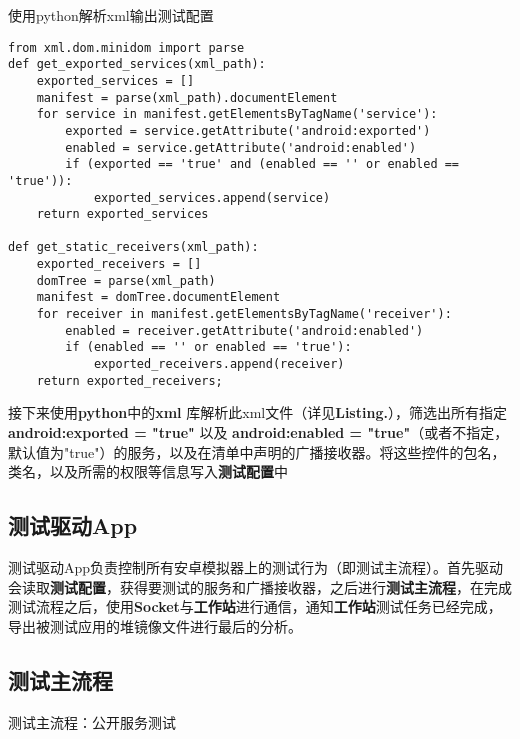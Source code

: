 \begin{listing}[htbp]
	\centering
	\caption{使用python解析xml输出测试配置}
	\begin{verbatim}
from xml.dom.minidom import parse
def get_exported_services(xml_path):
	exported_services = []
	manifest = parse(xml_path).documentElement 
	for service in manifest.getElementsByTagName('service'):
		exported = service.getAttribute('android:exported')
		enabled = service.getAttribute('android:enabled')
		if (exported == 'true' and (enabled == '' or enabled == 'true')):
			exported_services.append(service)
	return exported_services
	
def get_static_receivers(xml_path):
	exported_receivers = []
	domTree = parse(xml_path)
	manifest = domTree.documentElement
	for receiver in manifest.getElementsByTagName('receiver'):
		enabled = receiver.getAttribute('android:enabled')
		if (enabled == '' or enabled == 'true'):
			exported_receivers.append(receiver)
	return exported_receivers;
	\end{verbatim}
	\label{python:get services}	
\end{listing}

接下来使用\textbf{python}中的\textbf{xml} 库解析此xml文件（详见\textbf{Listing.}\redbf{\ref{python:get services}}），筛选出所有指定\textbf{android:exported = "true"} 以及 \textbf{android:enabled = "true"}（或者不指定，默认值为"true"）的服务，以及在清单中声明的广播接收器。将这些控件的包名，类名，以及所需的权限等信息写入\textbf{测试配置}中
\subsection{测试驱动App}\label{test driver app}
测试驱动App负责控制所有安卓模拟器上的测试行为（即测试主流程\redbf{\ref{main flow}}）。首先驱动会读取\textbf{测试配置}，获得要测试的服务和广播接收器，之后进行\textbf{测试主流程}，在完成测试流程之后，使用\textbf{Socket}与\textbf{工作站}进行通信，通知\textbf{工作站}测试任务已经完成，导出被测试应用的堆镜像文件进行最后的分析。
\subsection{测试主流程}\label{main flow}

\begin{algorithm}
	\caption{测试主流程：公开服务测试}
	\label{alg:service}
	\begin{algorithmic}[1]
			\ENDIF
				\ELSE
				\ENDIF
			\ENDWHILE
			\ENDIF
		\ENDFOR
	\end{algorithmic}
\end{algorithm}

